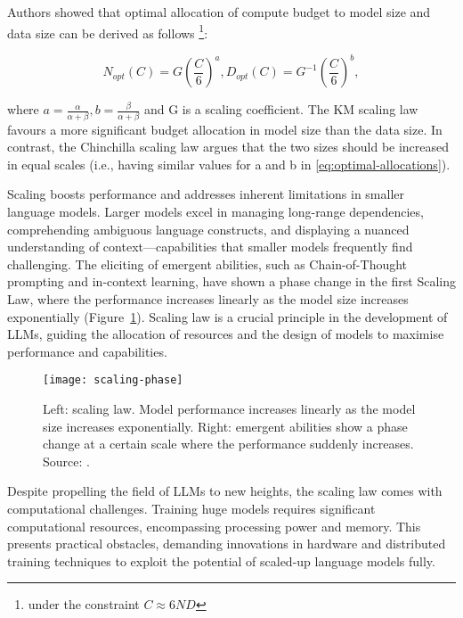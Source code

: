 \begin{enumerate}
{		      Authors showed that optimal allocation of compute budget to model size and data size can be derived as follows \footnote{under the constraint \(C \approx 6ND\)}:

		      \begin{center}
			      \begin{equation}
				      N_{opt}(C) = G(\frac{C}{6})^a, D_{opt}(C) = G^{-1}(\frac{C}{6})^b, \label{eq:optimal-allocations}
			      \end{equation}
		      \end{center}

		      \noindent where $a=\frac{\alpha}{\alpha+\beta}, b=\frac{\beta}{\alpha+\beta}$ and G is a scaling coefficient.
		      The KM scaling law favours a more significant budget allocation in model size than the data size. In contrast, the Chinchilla scaling law argues that the two sizes should be increased in equal scales \cite{hoffmann2022training} (i.e., having similar values for a and b in \eqref{eq:optimal-allocations}).
	      }
\end{enumerate}

Scaling boosts performance and addresses inherent limitations in smaller language models.
Larger models excel in managing long-range dependencies, comprehending ambiguous language constructs, and displaying a nuanced understanding of context---capabilities that smaller models frequently find challenging.
The eliciting of emergent abilities, such as Chain-of-Thought prompting and in-context learning, have shown a phase change in the first Scaling Law, where the performance increases linearly as the model size increases exponentially (Figure~\ref{fig:scaling-phase}).
Scaling law is a crucial principle in the development of LLMs, guiding the allocation of resources and the design of models to maximise performance and capabilities.

\begin{figure}[h!]
	\centering
	\texttt{[image: scaling-phase]}
	\caption{Left: scaling law. Model performance increases linearly as the model size increases exponentially. Right: emergent abilities show a phase change at a certain scale where the performance suddenly increases. Source: \protect\textcite{yaofu2023emergent}.}
	\label{fig:scaling-phase}
\end{figure}

Despite propelling the field of LLMs to new heights, the scaling law comes with computational challenges.
Training huge models requires significant computational resources, encompassing processing power and memory.
This presents practical obstacles, demanding innovations in hardware and distributed training techniques to exploit the potential of scaled-up language models fully.


